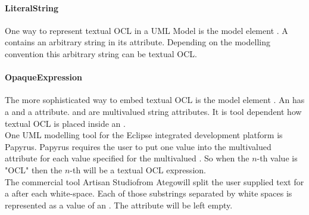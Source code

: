 \paragraph{LiteralString}
One way to represent textual OCL in a UML Model is the model element . A  contains an arbitrary string in its  attribute. Depending on the modelling convention this arbitrary string can be textual OCL.
\paragraph{OpaqueExpression}The more sophisticated way to embed textual OCL is the model element . An  has a  and a  attribute.  and  are multivalued string attributes. It is tool dependent how textual OCL is placed inside an .\\One UML modelling tool for the Eclipse integrated development platform is Papyrus. Papyrus requires the user to put one value into the multivalued  attribute for each value specified for the multivalued . So when the $n$-th  value is "OCL" then the $n$-th  will be a textual OCL expression.\\
The commercial tool Artisan Studio\textregistered from Atego\texttrademark will split the user supplied text for a  after each white-space. Each of those substrings separated by white spaces is represented as a  value of an . The  attribute will be left empty.


